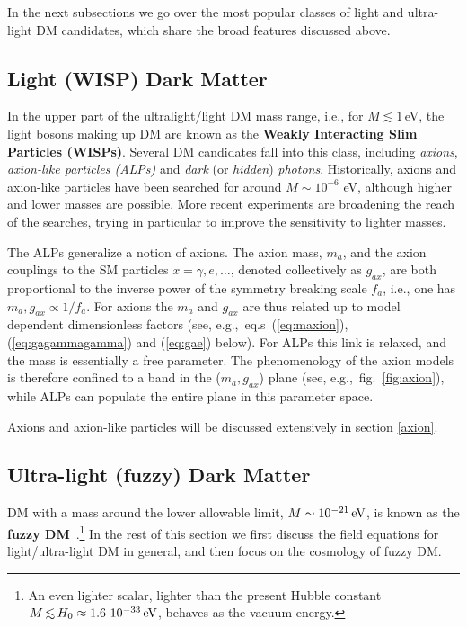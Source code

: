 \smallskip

In the next subsections we go over the most popular classes of light and ultra-light DM candidates, which share the broad features discussed above. 



\subsection{Light (WISP) Dark Matter} \label{sec:WISPs} 

In the upper part of the ultralight/light DM mass range, i.e., for $M \lesssim 1\,$eV, the light bosons making up DM are known as the {\bf Weakly Interacting Slim Particles (WISPs)}. Several DM candidates fall into this class, including {\em axions}, {\em axion-like particles (ALPs)} and {\em dark} (or {\em hidden}) {\em photons}. Historically, axions and axion-like particles have been searched for around $M \sim 10^{-6}$ eV, although higher and lower masses are possible. 
More recent experiments are broadening the reach of the searches, trying in particular to improve the sensitivity to lighter masses.

The ALPs generalize a notion of axions. 
The axion mass, $m_a$, and the axion couplings to the SM particles $x=\gamma, e, \ldots$, denoted collectively as $g_{ax}$, are both proportional to the inverse power of the symmetry breaking scale $f_a$, i.e., one has $m_a, g_{ax}\propto 1/f_a$. For axions the $m_a$ and $g_{ax}$ are thus related up to  model dependent dimensionless factors (see, e.g.,~eq.s~(\ref{eq:maxion}), (\ref{eq:gagammagamma}) and (\ref{eq:gae}) below). For ALPs this link is relaxed, and the mass is essentially a free parameter. 
The phenomenology of the axion models is therefore confined to a band in the ($m_a,g_{ax}$) plane (see, e.g.,~fig.~\ref{fig:axion}), while ALPs can populate the entire plane in this parameter space.

Axions and axion-like particles will be discussed extensively in section \ref{axion}.


\subsection{Ultra-light (fuzzy) Dark Matter} \label{sec:fuzzyDM} 
DM with a mass around the lower allowable limit, $M \sim 10^{-21}\,{\rm eV}$, 
is known as the {\bf fuzzy DM}~\cite{FuzzyDM}.\footnote{An even lighter scalar, lighter than the present Hubble constant $M \circa{<} H_0\approx 1.6~10^{-33}\eV$, behaves as the vacuum energy.} 
In the rest of this section we first discuss the field equations for light/ultra-light DM in general, and then focus on the cosmology of fuzzy DM. 

